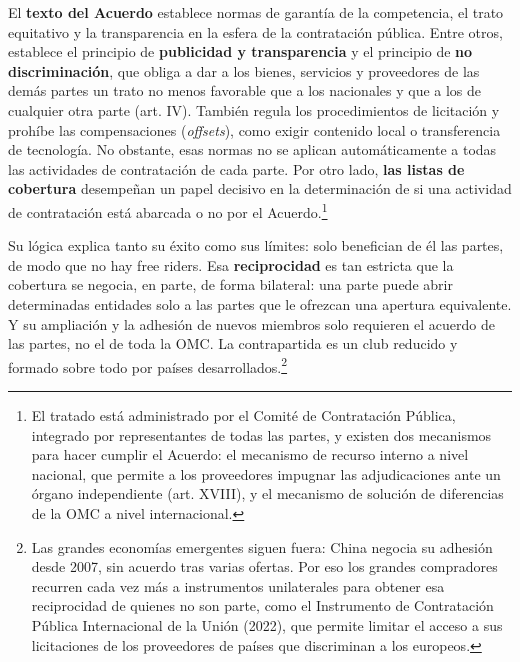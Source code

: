 \documentclass[10pt,a4paper]{article}
\begin{document}
El \textbf{texto del Acuerdo} establece normas de garantía de la competencia, el trato equitativo y la transparencia en la esfera de la contratación pública. Entre otros, establece el principio de \textbf{publicidad y transparencia} y el principio de \textbf{no discriminación}, que obliga a dar a los bienes, servicios y proveedores de las demás partes un trato no menos favorable que a los nacionales y que a los de cualquier otra parte (art. IV). También regula los procedimientos de licitación y prohíbe las compensaciones (\textit{offsets}), como exigir contenido local o transferencia de tecnología. No obstante, esas normas no se aplican automáticamente a todas las actividades de contratación de cada parte. Por otro lado, \textbf{las listas de cobertura} desempeñan un papel decisivo en la determinación de si una actividad de contratación está abarcada o no por el Acuerdo.\footnote{%
  El tratado está administrado por el Comité de Contratación Pública, integrado por representantes de todas las partes, y existen dos mecanismos para hacer cumplir el Acuerdo: el mecanismo de recurso interno a nivel nacional, que permite a los proveedores impugnar las adjudicaciones ante un órgano independiente (art. XVIII), y el mecanismo de solución de diferencias de la OMC a nivel internacional.
}

Su lógica explica tanto su éxito como sus límites: solo benefician de él las partes, de modo que no hay free riders. Esa \textbf{reciprocidad} es tan estricta que la cobertura se negocia, en parte, de forma bilateral: una parte puede abrir determinadas entidades solo a las partes que le ofrezcan una apertura equivalente. Y su ampliación y la adhesión de nuevos miembros solo requieren el acuerdo de las partes, no el de toda la OMC. La contrapartida es un club reducido y formado sobre todo por países desarrollados.\footnote{%
  Las grandes economías emergentes siguen fuera: China negocia su adhesión desde 2007, sin acuerdo tras varias ofertas. Por eso los grandes compradores recurren cada vez más a instrumentos unilaterales para obtener esa reciprocidad de quienes no son parte, como el Instrumento de Contratación Pública Internacional de la Unión (2022), que permite limitar el acceso a sus licitaciones de los proveedores de países que discriminan a los europeos.
}
\end{document}
